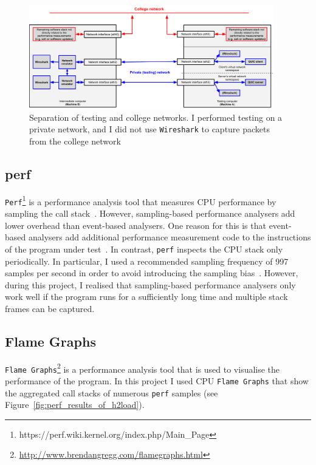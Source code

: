 \documentclass[12pt,a4paper,twoside,openright]{report}
\begin{document}
    \begin{figure}[H]
    \centering
    \includegraphics[width=0.95\textwidth]{figs/Wireshark_separation.png}
    \caption[Separation of testing and college networks]{Separation of testing and college networks. I performed testing on a private network, and I did not use \texttt{Wireshark} to capture packets from the college network}
    \label{fig:Wireshark_separation}
    \end{figure}



\subsection{perf}
\texttt{Perf}\footnote{https://perf.wiki.kernel.org/index.php/Main\_Page} is a performance analysis tool that measures CPU performance by sampling the call stack~\cite{CPU_Flame_graphs}.
However, sampling-based performance analysers add lower overhead than event-based analysers.
One reason for this is that event-based analysers add additional performance measurement code to the instructions of the program under test~\cite{CPU_Flame_graphs}.
In contrast, \texttt{perf} inspects the CPU stack only periodically.
In particular, I used a recommended sampling frequency of 997 samples per second in order to avoid introducing the sampling bias~\cite{perf-cpu-sample}.
However, during this project, I realised that sampling-based performance analysers only work well if the program runs for a sufficiently long time and multiple stack frames can be captured.



\subsection{Flame Graphs}
\texttt{Flame Graphs}\footnote{\url{http://www.brendangregg.com/flamegraphs.html}} is a performance analysis tool that is used to visualise the performance of the program.
In this project I used CPU \texttt{Flame Graphs} that show the aggregated call stacks of numerous \texttt{perf} samples (see Figure~\ref{fig:perf_results_of_h2load}).
\end{document}
